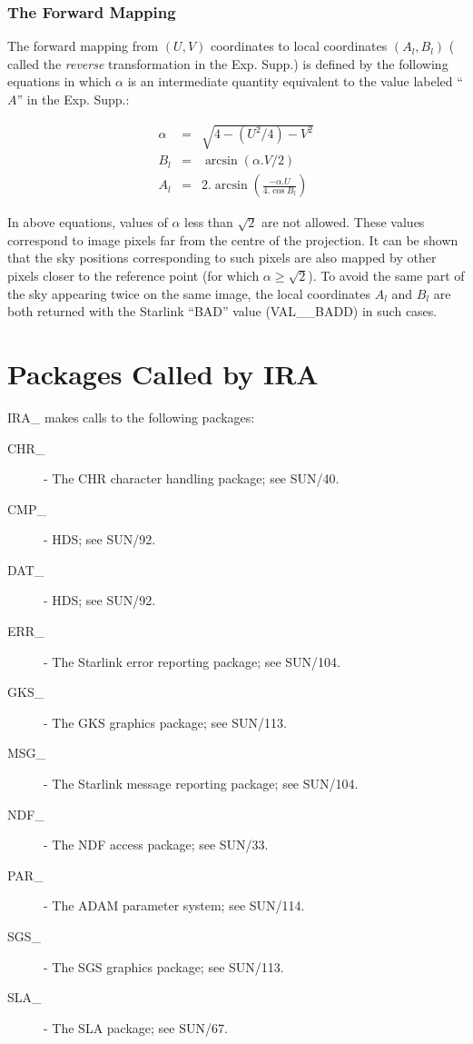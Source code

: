\subsubsection {The Forward Mapping}
The forward mapping from $(U,V)$ coordinates to local coordinates
$(A_{l},B_{l})$
( called the {\em reverse} transformation in the Exp. Supp.) is defined by
the following equations in which $\alpha$ is an intermediate quantity equivalent
to the value labeled ``$A$'' in the Exp. Supp.:

\begin{eqnarray*}
\alpha & = & \sqrt{4-(U^{2}/4)-V^{2} }\\
B_{l} & = & \arcsin (\alpha.V/2)\\
A_{l} & = & 2.\arcsin\left(\frac{-\alpha.U}{4.\cos B_{l}}\right)
\end{eqnarray*}

In above equations, values of $\alpha$ less than $\sqrt{2}$ are not allowed.
These values correspond to image pixels far from the centre of the projection.
It can be shown that the sky positions corresponding to such pixels are also
mapped by other pixels closer to the reference point (for which
$\alpha\geq\sqrt{2}$). To avoid the same part of the sky appearing twice on the
same image, the local coordinates $A_{l}$ and $B_{l}$ are both returned with the
Starlink ``BAD'' value (VAL\_\_BADD) in such cases.

\section {Packages Called by IRA}
IRA\_ makes calls to the following packages:
\begin {description}
\item [CHR\_] - The CHR character handling package; see SUN/40.
\item [CMP\_] - HDS; see SUN/92.
\item [DAT\_] - HDS; see SUN/92.
\item [ERR\_] - The Starlink error reporting package; see SUN/104.
\item [GKS\_] - The GKS graphics package; see SUN/113.
\item [MSG\_] - The Starlink message reporting package; see SUN/104.
\item [NDF\_] - The NDF access package; see SUN/33.
\item [PAR\_] - The ADAM parameter system; see SUN/114.
\item [SGS\_] - The SGS graphics package; see SUN/113.
\item [SLA\_] - The SLA package; see SUN/67.
\end{description}

